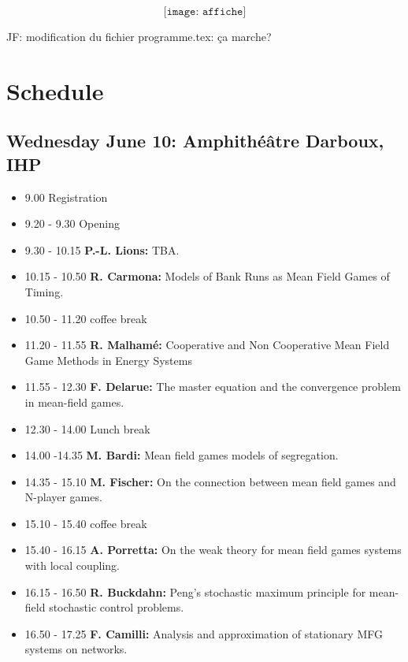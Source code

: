 \documentclass[11pt]{article}
\begin{document}
\[
\texttt{[image: affiche]}
\]
\vfill\eject

JF: modification du fichier programme.tex: ça marche?


\section*{Schedule}

\subsection*{Wednesday June  10: Amphith{\'e}{\^a}tre Darboux, IHP}
\begin{itemize}
\item 9.00  Registration 
\item 9.20 - 9.30  Opening
\item 9.30 - 10.15  {\bf P.-L. Lions:}  TBA.
\item 10.15 - 10.50  {\bf R. Carmona:}  Models of Bank Runs as Mean Field Games of Timing. 
\item 10.50 - 11.20   coffee break
\item 11.20 - 11.55  {\bf R. Malham{\' e}:}   Cooperative and Non Cooperative Mean Field Game Methods in Energy Systems 
\item 11.55 - 12.30  {\bf F. Delarue:}  The master equation and the convergence problem in mean-field games.
\item 12.30 - 14.00  Lunch break
\item 14.00 -14.35 {\bf  M. Bardi:} Mean field games models of segregation.
\item 14.35 - 15.10 {\bf M. Fischer:} On the connection between mean field games and N-player games. 
\item 15.10 - 15.40  coffee break
\item 15.40 - 16.15  {\bf  A. Porretta:} On the weak theory for mean field games systems with local coupling. 
\item 16.15 - 16.50 {\bf  R. Buckdahn:} Peng's stochastic maximum principle for mean-field stochastic control problems. 
\item 16.50 - 17.25 {\bf  F. Camilli:} Analysis and approximation of   stationary MFG systems  on  networks.
\end{itemize}
\vfill\eject
\end{document}
